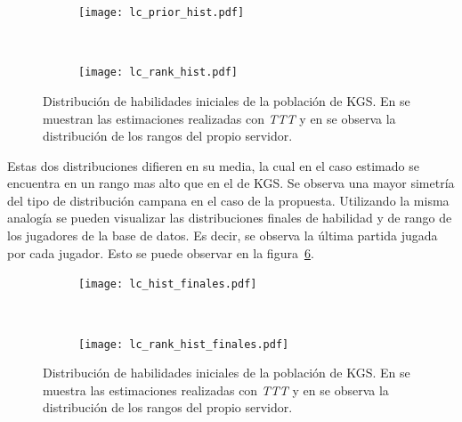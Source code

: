 \documentclass[11pt,twoside,spanish]{report} %
\begin{document}
\begin{figure}[H]
	\centering
	\begin{subfigure}[t]{.49\textwidth}
		\centering
		\texttt{[image: lc\_prior\_hist.pdf]}
		\caption{}
		\label{fig:hist_a}
	\end{subfigure}
	~
	\begin{subfigure}[t]{.49\textwidth}
		\centering
		\texttt{[image: lc\_rank\_hist.pdf]}
		\caption{}
		\label{fig:hist_b}
	\end{subfigure}
	\caption{Distribuci\'on de habilidades iniciales de la poblaci\'on de KGS. En  se muestran las estimaciones realizadas con \textit{TTT} y en   se observa la distribuci\'on de los rangos del propio servidor.}
	\label{fig:hist_rank}
\end{figure}

Estas dos distribuciones difieren en su media, la cual en el caso estimado se encuentra en un rango mas alto que en el de KGS.
Se observa una mayor simetr\'ia del tipo de distribuci\'on campana en el caso de la propuesta.
Utilizando la misma analog\'ia se pueden visualizar las distribuciones finales de habilidad y de rango de los jugadores de la base de datos.
Es decir, se observa la \'ultima partida jugada por cada jugador.
Esto se puede observar en la figura~\ref{fig:hist_rank_fin}.

\begin{figure}[H]
	\centering
	\begin{subfigure}[t]{.49\textwidth}
		\centering
		\texttt{[image: lc\_hist\_finales.pdf]}
		\caption{}
		\label{fig:hist_fin_a}
	\end{subfigure}
	~
	\begin{subfigure}[t]{.49\textwidth}
		\centering
		\texttt{[image: lc\_rank\_hist\_finales.pdf]}
		\caption{}
		\label{fig:hist_fin_b}
	\end{subfigure}
	\caption{Distribuci\'on de habilidades iniciales de la poblaci\'on de KGS. En  se muestra las estimaciones realizadas con \textit{TTT} y en  se observa la distribuci\'on de los rangos del propio servidor.}
	\label{fig:hist_rank_fin}
\end{figure}
\end{document}
